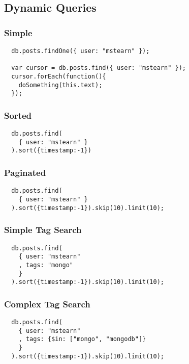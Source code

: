 \documentclass{beamer}
\begin{document}
\subsection{Dynamic Queries}

\begin{frame}[fragile]
  \frametitle{Simple}

  \begin{verbatim}
  db.posts.findOne({ user: "mstearn" });

  var cursor = db.posts.find({ user: "mstearn" });
  cursor.forEach(function(){
    doSomething(this.text);
  });
  \end{verbatim}
  
\end{frame}

\begin{frame}[fragile]
  \frametitle{Sorted}

  \begin{verbatim}
  db.posts.find(
    { user: "mstearn" }
  ).sort({timestamp:-1})
  \end{verbatim}
  
\end{frame}
\begin{frame}[fragile]
  \frametitle{Paginated}

  \begin{verbatim}
  db.posts.find(
    { user: "mstearn" }
  ).sort({timestamp:-1}).skip(10).limit(10);
  \end{verbatim}
  
\end{frame}
\begin{frame}[fragile]
  \frametitle{Simple Tag Search}

  \begin{verbatim}
  db.posts.find(
    { user: "mstearn"
    , tags: "mongo"
    }
  ).sort({timestamp:-1}).skip(10).limit(10);
  \end{verbatim}
  
\end{frame}

\begin{frame}[fragile]
  \frametitle{Complex Tag Search}

  \begin{verbatim}
  db.posts.find(
    { user: "mstearn"
    , tags: {$in: ["mongo", "mongodb"]}
    }
  ).sort({timestamp:-1}).skip(10).limit(10);
  \end{verbatim}
  
\end{frame}
\end{document}
